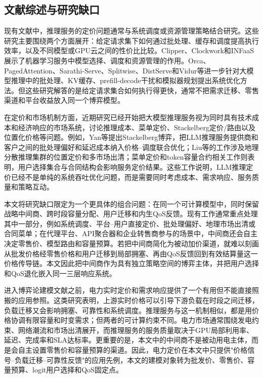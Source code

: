 \documentclass[UTF8,11pt]{ctexart}
\begin{document}
\subsection{文献综述与研究缺口}
\label{sec:related_work}

现有文献中，推理服务的定价问题通常与系统调度或资源管理策略结合研究\cite{crankshaw2017clipper,yu2022orca,kwon2023pagedattention}。这些研究主要围绕两个方面展开：给定请求集下如何通过批处理、缓存和调度提高执行效率，以及不同模型或GPU云之间的性价比比较。Clipper、Clockwork和INFaaS展示了机器学习服务中模型选择、调度和资源管理的作用\cite{crankshaw2017clipper,gujarati2020clockwork,romero2021infaas}。Orca、PagedAttention、Sarathi-Serve、Splitwise、DistServe和Vidur等进一步针对大模型推理中的批处理、KV缓存、prefill-decode干扰和模拟器规划提出系统优化方法\cite{yu2022orca,kwon2023pagedattention,agrawal2024sarathiserve,patel2024splitwise,zhong2024distserve,agrawal2024vidur}。但这些研究解答的是给定请求集合如何执行得更快，通常不把需求迁移、零售渠道和平台收益放入同一个博弈模型。

在定价和市场机制方面，近期研究已经开始把大模型推理服务视为同时具有技术成本和经济响应的市场系统，讨论推理成本、菜单定价、Stackelberg定价/路由以及位置化价格等问题\cite{demirer2025emerging,erdil2025inference,bergemann2025menu,guo2026prillm,yan2026stackelberg,liu2026locational}。例如，Yan等提出Stackelberg博弈，把LLM推理服务提供商和客户之间的批处理偏好和延迟成本纳入价格--调度联合优化；Liu等的工作涉及地理分散推理集群的位置定价和多市场出清；菜单定价和token容量合约相关工作则表明，用户选择集合与合同结构会影响服务定价结果\cite{bergemann2025menu,xing2026tokenfutures}。这些工作说明，LLM推理定价已经不是单纯的系统吞吐优化问题，而是需要同时考虑成本、需求响应、服务质量和策略互动。

本文将研究缺口限定为一个更具体的组合问题：在同一个可计算模型中，同时保留战略中间商、跨时段容量分配、用户迁移和内生QoS反馈。现有工作通常重点处理其中一部分，例如系统调度、平台--用户直接定价、批处理偏好、地理市场出清或合同菜单；在代理平台、API聚合器和企业转售商参与的场景中，中间商还会自主决定零售价、模型路由和容量预算。若把中间商简化为被动加价渠道，就难以刻画从批发价格经零售价格和用户迁移到局部拥塞、再由QoS反馈回到有效结算量这一价格传导链。本文因此把中间商作为具有独立策略空间的博弈主体，并把用户选择和QoS退化嵌入同一三层响应系统。

进入博弈论建模文献之前，电力实时定价和需求响应提供了一个有用但不能直接照搬的应用参照\cite{schweppe1988spot,borenstein2005long,albadi2008summary,faruqui2010household,siano2014demand}。这类研究表明，上游实时价格可以引导下游负载在时段之间迁移，负载迁移又会影响拥塞、可靠性和系统调度。推理服务与这一机制相似，都是用价格协调有限容量和时变需求；但两者的可计算约束不同。电力市场通常围绕发电约束、网络潮流和市场出清展开，而推理服务的服务质量取决于GPU局部利用率、延迟、完成率和SLA达标率。更重要的是，本文中的中间商不是被动用电主体，而是会自主设置零售价和容量预算的渠道。因此，电力定价在本文中只提供"价格信号--负载迁移--可靠性反馈"的应用先例，本文的建模对象转为批发价、零售价、容量预算、logit用户选择和QoS固定点。
\end{document}
